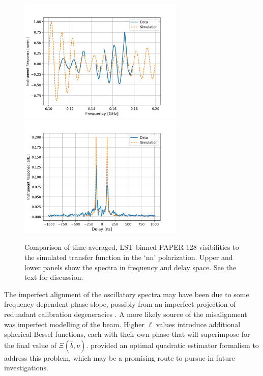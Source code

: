 \begin{figure}
\centering
\includegraphics[width=0.7\textwidth]{chapters/global_signal/figures/data_sim_freq.png}
\includegraphics[width=0.7\textwidth]{chapters/global_signal/figures/data_sim_delay.png}
\caption[Comparison of time-averaged PAPER-128 visibilities to the simulated transfer function. ]{Comparison of time-averaged, LST-binned PAPER-128 visibilities to the simulated transfer function in the `nn' polarization. Upper and lower panels show the spectra in frequency and delay space. See the text for discussion.}
\label{fig:global_signal_data_vs_sim}
\end{figure}

The imperfect alignment of the oscillatory spectra may have been due to some frequency-dependent phase slope, possibly from an imperfect projection of redundant calibration degeneracies \citep[e.g.][Chapter~\ref{chapter:polcal}]{Dillon.17}. A more likely source of the misalignment was imperfect modelling of the beam. Higher $\ell$ values introduce additional spherical Bessel functions, each with their own phase that will superimpose for the final value of $\Xi(\hat{b},\nu)$.
\cite{Presley.15} provided an optimal quadratic estimator formalism to address this problem, which may be a promising route to pursue in future investigations.

